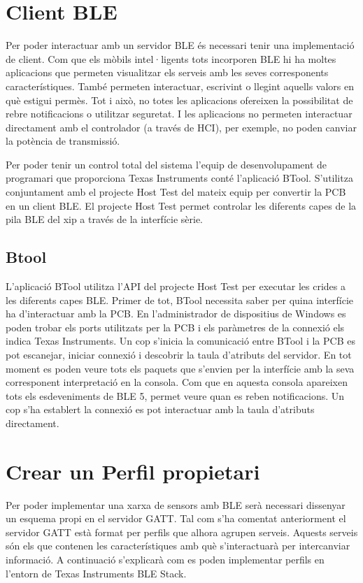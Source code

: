 \section{Client BLE}
Per poder interactuar amb un servidor BLE és necessari tenir una implementació de client.
Com que els mòbils intel·ligents tots incorporen BLE hi ha moltes aplicacions que permeten visualitzar els serveis amb les seves corresponents característiques.
També permeten interactuar, escrivint o llegint aquells valors en què estigui permès.
Tot i això, no totes les aplicacions ofereixen la possibilitat de rebre notificacions o utilitzar seguretat.
I les aplicacions no permeten interactuar directament amb el controlador (a través de HCI), per exemple, no poden canviar la potència de transmissió. 

Per poder tenir un control total del sistema l'equip de desenvolupament de programari que proporciona Texas Instruments conté l'aplicació BTool.
S'utilitza conjuntament amb el projecte Host Test del mateix equip per convertir la PCB en un client BLE.
El projecte Host Test permet controlar les diferents capes de la pila BLE del xip a través de la interfície sèrie.

\subsection{Btool}
L'aplicació BTool utilitza l'API del projecte Host Test per executar les crides a les diferents capes BLE.
Primer de tot, BTool necessita saber per quina interfície ha d'interactuar amb la PCB.
En l'administrador de dispositius de Windows es poden trobar els ports utilitzats per la PCB i els paràmetres de la connexió els indica Texas Instruments\cite{serial_params}.
Un cop s'inicia la comunicació entre BTool i la PCB es pot escanejar, iniciar connexió i descobrir la taula d'atributs del servidor.
En tot moment es poden veure tots els paquets que s'envien per la interfície amb la seva corresponent interpretació en la consola.
Com que en aquesta consola apareixen tots els esdeveniments de BLE 5, permet veure quan es reben notificacions.
Un cop s'ha establert la connexió es pot interactuar amb la taula d'atributs directament.


\section{Crear un Perfil propietari}
Per poder implementar una xarxa de sensors amb BLE serà necessari dissenyar un esquema propi en el servidor GATT.
Tal com s'ha comentat anteriorment el servidor GATT està format per perfils que alhora agrupen serveis.
Aquests serveis són els que contenen les característiques amb què s'interactuarà per intercanviar informació.
A continuació s'explicarà com es poden implementar perfils en l'entorn de Texas Instruments BLE Stack.

